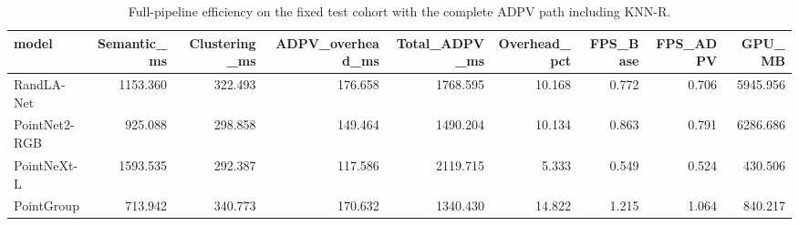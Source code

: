 \begin{table}
\caption{Full-pipeline efficiency on the fixed test cohort with the complete ADPV path including KNN-R.}
\label{tab:efficiency}
\begin{tabular}{lrrrrrrrr}
\toprule
model & Semantic\_ms & Clustering\_ms & ADPV\_overhead\_ms & Total\_ADPV\_ms & Overhead\_pct & FPS\_Base & FPS\_ADPV & GPU\_MB \\
\midrule
RandLA-Net & 1153.360 & 322.493 & 176.658 & 1768.595 & 10.168 & 0.772 & 0.706 & 5945.956 \\
PointNet2-RGB & 925.088 & 298.858 & 149.464 & 1490.204 & 10.134 & 0.863 & 0.791 & 6286.686 \\
PointNeXt-L & 1593.535 & 292.387 & 117.586 & 2119.715 & 5.333 & 0.549 & 0.524 & 430.506 \\
PointGroup & 713.942 & 340.773 & 170.632 & 1340.430 & 14.822 & 1.215 & 1.064 & 840.217 \\
\bottomrule
\end{tabular}
\end{table}
